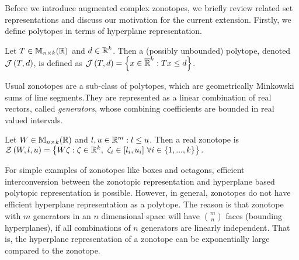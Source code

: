 
Before we introduce augmented complex zonotopes, we briefly review
related set representations and discuss our motivation for the
current extension.
Firstly, we define polytopes in terms of hyperplane representation.
%
\begin{definition}
Let $T\in\mathbb{M}_{n\times k}(\mathbb{\mathbb{R}})$ and $d\in\mathbb{R}^k$.  Then a (possibly
unbounded) polytope, denoted $\mathcal{J}\left(T,d\right)$, is defined as
$\mathcal{J}\left(T,d\right) = \left\{x\in\mathbb{\overline{R}}^k: Tx\leq d\right\}$.
\end{definition}
%
Usual zonotopes are a sub-class of polytopes, which are geometrically
Minkowski sums of line segments.They are represented as a linear
combination of real vectors, called \emph{generators}, whose combining
coefficients are bounded in real valued intervals.
\begin{definition}
Let $W\in\mathbb{M}_{n\times k}(\mathbb{\mathbb{R}})$ and $l,u\in\mathbb{R}^m: l\leq u$.  Then 
 a real zonotope is
$\mathcal{Z}\left(W,l,u\right) = \left\{W\zeta: \zeta\in\mathbb{R}^k,~\zeta_i\in[l_i,u_i]~\forall i\in \{1,...,k\}\right\}.$
\end{definition}
%
For simple examples of zonotopes like boxes and octagons, efficient
interconversion between the zonotopic representation and hyperplane
based polytopic representation is possible.  However, in general,
zonotopes do not have efficient hyperplane representation as a
polytope.  The reason is that zonotope with $m$ generators in an $n$
dimensional space will have ${m}\choose{n}$ faces (bounding
hyperplanes), if all combinations of $n$ generators are linearly
independent.  That is, the hyperplane representation of a zonotope can
be exponentially large compared to the zonotope.

